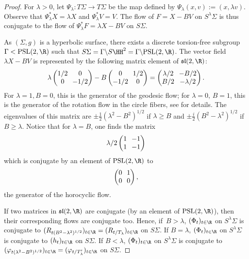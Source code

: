\begin{proof}
For $\lambda > 0$, let $\Psi_\lambda : T\Sigma \to T\Sigma$ be the map defined by $\Psi_\lambda(x,v) := (x,\lambda v)$. Observe that $\Psi_\lambda^* X = \lambda X$ and $\Psi_\lambda^*V=V$. The flow of $F = X-BV$ on $S^\lambda \Sigma$ is thus conjugate to the flow of $\Psi_\lambda^* F = \lambda X -BV$ on $S\Sigma$.

{\color{black}As $(\Sigma,g)$ is a hyperbolic surface, there exists a discrete torsion-free subgroup $\Gamma < \mathrm{PSL}(2,\R)$ such that $S\Sigma = \Gamma \backslash S\HH^2 = \Gamma\backslash\mathrm{PSL}(2,\R)$.} The vector field $\lambda X - BV$ is represented by the following matrix element of $\mathfrak{sl}(2,\R)$:
\[
\arraycolsep3.5pt
\lambda \begin{pmatrix} 1/2 & 0 \\ 0 & -1/2 \end{pmatrix} - B \begin{pmatrix} 0 & 1/2 \\ -1/2 & 0\end{pmatrix} = \begin{pmatrix} \lambda/2 & -B/2 \\ B/2 & -\lambda/2 \end{pmatrix}.
\]
For $\lambda = 1, B=0$, this is the generator of the geodesic flow; for $\lambda=0$, $B=1$, this is the generator of the rotation flow in the circle fibers, see \cite[\S 2.1]{Flaminio-Forni-03} for details. The eigenvalues of this matrix are $\pm\tfrac{1}{2}(\lambda^2-B^2)^{1/2}$ if $\lambda \geq B$ and $\pm \tfrac{i}{2}(B^2-\lambda^2)^{1/2}$ if $B \geq \lambda$. Notice that for $\lambda = B$, one finds the matrix
\[
\arraycolsep3.5pt
\lambda/2 \begin{pmatrix} 1 & -1 \\ 1 & -1 \end{pmatrix}
\]
which is conjugate by an element of $\mathrm{PSL}(2,\R)$ to
\[
\arraycolsep3.5pt
\begin{pmatrix} 0 & 1 \\ 0 & 0 \end{pmatrix},
\]
the generator of the horocyclic flow.

If two matrices in $\mathfrak{sl}(2,\R)$ are conjugate (by an element of $\mathrm{PSL}(2,\R)$), then their corresponding flows are conjugate too. Hence, if~$B > \lambda$, $(\Phi_t)_{t \in \R}$ on $S^\lambda\Sigma$ is conjugate to $(R_{t(B^2-\lambda^2)^{1/2}})_{t \in \R} = (R_{t/T_\lambda})_{t \in \R}$ on $S\Sigma$. If $B=\lambda$, $(\Phi_t)_{t \in \R}$ on $S^\lambda\Sigma$ is conjugate to $(h_t)_{t \in \R}$ on $S\Sigma$. If $B < \lambda$, $(\Phi_t)_{t \in \R}$ on $S^\lambda\Sigma$ is conjugate to $(\varphi_{t(\lambda^2-B^2)^{1/2}})_{t \in \R} = (\varphi_{t/T'_\lambda})_{t \in \R}$ on $S\Sigma$.
\end{proof}

